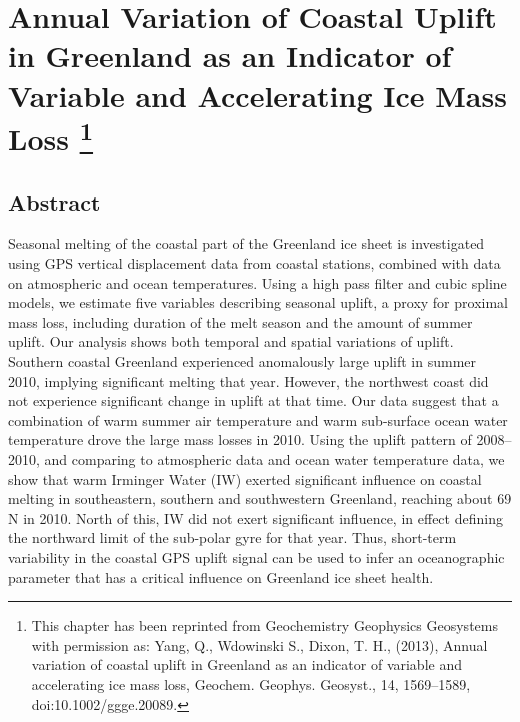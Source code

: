 \chapter[Annual Variation of Coastal Uplift in Greenland as an Indicator of Variable and Accelerating Ice Mass Loss]{Annual Variation of Coastal Uplift in Greenland as an Indicator of Variable and Accelerating Ice Mass Loss \footnote{This chapter has been reprinted from Geochemistry Geophysics Geosystems with permission as: Yang, Q., Wdowinski S., Dixon, T. H., (2013), Annual variation of coastal uplift in Greenland as an indicator of variable and accelerating ice mass loss, Geochem. Geophys. Geosyst., 14, 1569–1589, doi:10.1002/ggge.20089.}}

\section{Abstract} 
Seasonal melting of the coastal part of the Greenland ice sheet is investigated using GPS vertical displacement data from coastal stations, combined with data on atmospheric and ocean temperatures.
Using a high pass filter and cubic spline models, we estimate five variables describing seasonal uplift, a proxy for proximal mass loss, including duration of the melt season and the amount of summer uplift. Our analysis shows both temporal and spatial variations of uplift. Southern coastal Greenland experienced
anomalously large uplift in summer 2010, implying significant melting that year. However, the northwest coast did not experience significant change in uplift at that time. Our data suggest that a combination of warm summer air temperature and warm sub-surface ocean water temperature drove the large mass losses in 2010. Using the uplift pattern of 2008–2010, and comparing to atmospheric data and ocean water temperature data, we show that warm Irminger Water (IW) exerted significant influence on coastal melting in southeastern, southern and southwestern Greenland, reaching about 69 \textordmasculine N in 2010. North of this, IW did not exert significant influence, in effect defining the northward limit of the sub-polar gyre for that year. Thus, short-term variability in the coastal GPS uplift signal can be used to infer an oceanographic parameter that has a critical influence on Greenland ice sheet health.

